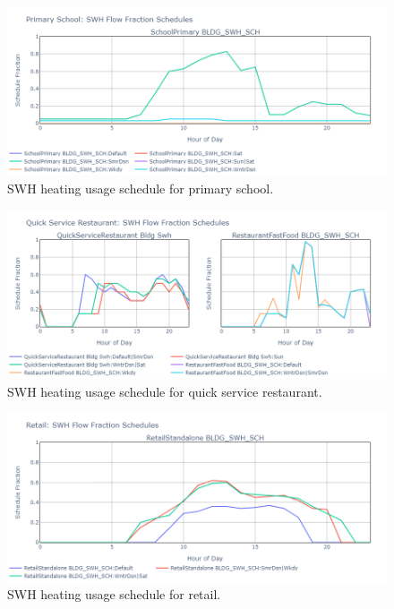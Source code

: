\begin{figure}
  \centering
  \includegraphics[width=\textwidth]{figures/swh_sched_primary school.png}
  \caption[SWH heating usage schedule for primary school]{SWH heating usage schedule for primary school.}
  \label{fig:swh_sched_primary_school}
\end{figure}

\begin{figure}
  \centering
  \includegraphics[width=\textwidth]{figures/swh_sched_quick service restaurant.png}
  \caption[SWH heating usage schedule for quick service restaurant]{SWH heating usage schedule for quick service restaurant.}
  \label{fig:swh_sched_quick_service_restaurant}
\end{figure}

\begin{figure}
  \centering
  \includegraphics[width=\textwidth]{figures/swh_sched_retail.png}
  \caption[SWH heating usage schedule for retail]{SWH heating usage schedule for retail.}
  \label{fig:swh_sched_retail}
\end{figure}

